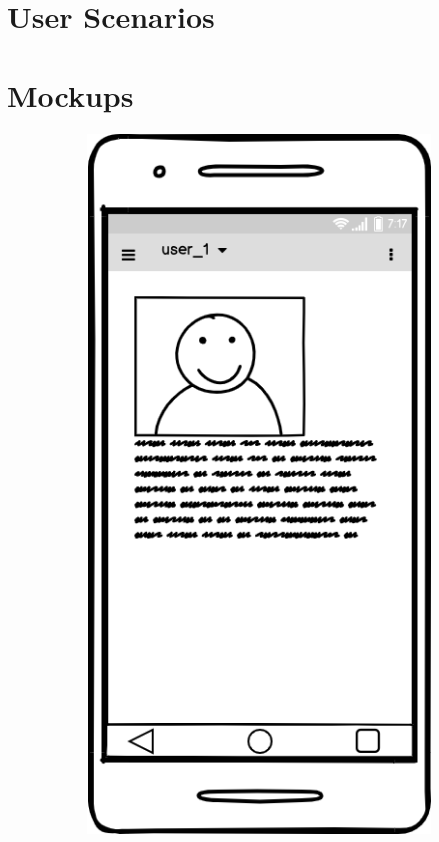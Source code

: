 \documentclass{article}
\begin{document}
\section*{User Scenarios}
\clearpage
\section*{Mockups}

\begin{figure}[!htb]
    \begin{subfigure}{0.3\textwidth}
        \includegraphics[width=\linewidth]{figs/user_1.png}

\end{subfigure}
\end{figure}
\end{document}
